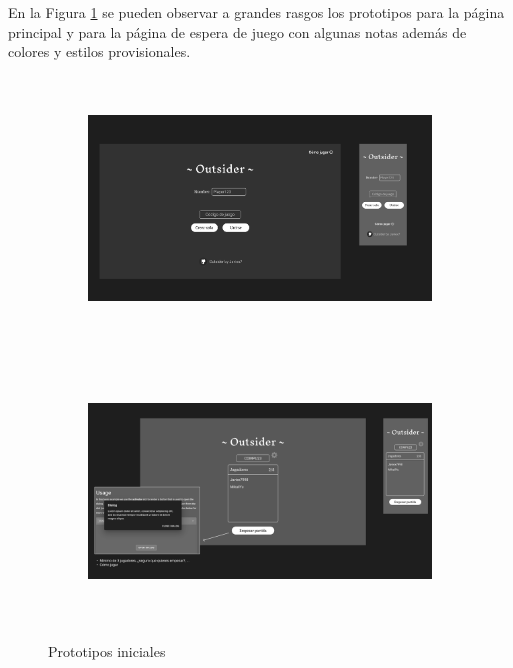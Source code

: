 En la Figura \ref{fig:res_designLanding} se pueden observar a grandes rasgos los 
prototipos para la página principal y para la página de espera de juego con algunas notas además de colores 
y estilos provisionales.


\begin{figure}[h]													
	\begin{subfigure}{\textwidth}
		\centering
		\includegraphics[height=7cm]{res_designLanding.png}
	\end{subfigure}
																																																																																																																																																																													
	\begin{subfigure}{\textwidth}
		\centering
		\includegraphics[height=7cm]{res_designLobby.png} 
	\end{subfigure}
																																																																																																																																																																																				
	\caption{Prototipos iniciales}
	\label{fig:res_designLanding}										
\end{figure}

